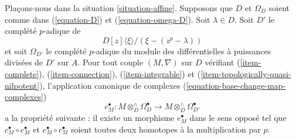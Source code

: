 \begin{lemma}
\label{lemma-computation}
Plaçons-nous dans la situation \ref{situation-affine}. Supposons que $D$ et $\Omega_D$ soient comme dans
(\ref{equation-D}) et (\ref{equation-omega-D}).
Soit $\lambda \in D$. Soit $D'$ le complété $p$-adique de
$$
D[z]\langle \xi \rangle/(\xi - (z^p - \lambda))
$$
et soit $\Omega_{D'}$ le complété $p$-adique du module des
différentielles à puissances divisées de $D'$ sur $A$. Pour tout couple $(M, \nabla)$
sur $D$ vérifiant (\ref{item-complete}), (\ref{item-connection}),
(\ref{item-integrable}) et (\ref{item-topologically-quasi-nilpotent}),
l'application canonique de complexes (\ref{equation-base-change-map-complexes})
$$
c_M^\bullet : M \otimes_D^\wedge \Omega^\bullet_D
\longrightarrow
M \otimes_D^\wedge \Omega^\bullet_{D'}
$$
a la propriété suivante : il existe un morphisme $e_M^\bullet$
dans le sens opposé tel que $c_M^\bullet \circ e_M^\bullet$
et $e_M^\bullet \circ c_M^\bullet$ soient toutes deux homotopes à la multiplication par $p$.
\end{lemma}


